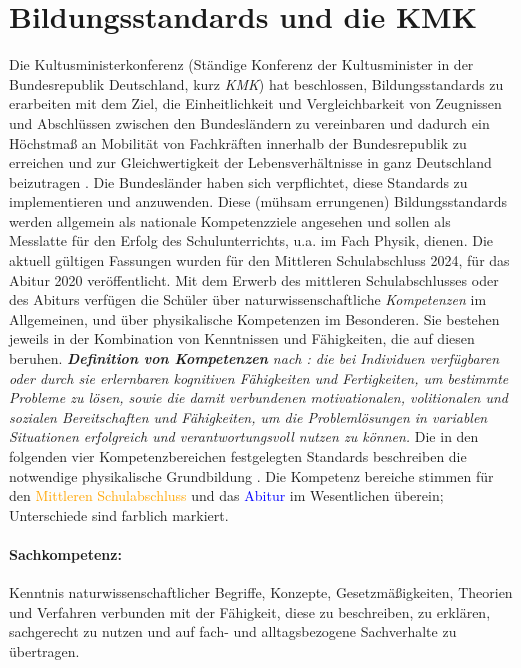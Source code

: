 \section{Bildungsstandards und die KMK}\label{KmK}
Die Kultusministerkonferenz (Ständige Konferenz der Kultusminister in der Bundesrepublik Deutschland, kurz \emph{KMK}) hat beschlossen, Bildungsstandards zu erarbeiten mit dem Ziel, die Einheitlichkeit und Vergleichbarkeit von Zeugnissen und Abschl{\"u}ssen zwischen den Bundesl{\"a}ndern zu vereinbaren und dadurch ein H{\"o}chstma{\ss} an Mobilit{\"a}t von Fachkr{\"a}ften innerhalb der Bundesrepublik zu erreichen und  zur Gleichwertigkeit der Lebensverh{\"a}ltnisse in ganz Deutschland beizutragen \autocite{KMK}. Die Bundesl{\"a}nder haben sich verpflichtet, diese Standards zu implementieren und anzuwenden. Diese (m{\"u}hsam errungenen) Bildungsstandards werden allgemein als nationale Kompetenzziele angesehen und sollen als Messlatte f{\"u}r den Erfolg des Schulunterrichts, u.a. im Fach Physik, dienen. Die aktuell gültigen Fassungen wurden für den Mittleren Schulabschluss 2024, für das Abitur 2020 veröffentlicht.
\mip
Mit dem Erwerb des mittleren Schulabschlusses oder des Abiturs verf{\"u}gen die Schüler {\"u}ber naturwissenschaftliche \emph{Kompetenzen} im Allgemeinen, und {\"u}ber physikalische Kompetenzen im Besonderen. Sie bestehen jeweils in der Kombination von Kenntnissen und Fähigkeiten, die auf diesen beruhen.  
\mip
\leftskip=0.5cm \rightskip=0.5cm {\emph{{\textbf{Definition von Kompetenzen}} nach \textcite{Weinert}: die bei Individuen verf{\"u}gbaren oder durch sie erlernbaren kognitiven F{\"a}higkeiten und Fertigkeiten, um bestimmte Probleme zu 
l{\"o}sen, sowie die damit verbundenen motivationalen, volitionalen und sozialen Bereitschaften und F{\"a}higkeiten, um die Probleml{\"o}sungen in variablen Situationen erfolgreich und verantwortungsvoll nutzen zu k{\"o}nnen.}} 
\mip
\leftskip=0cm \rightskip=0cm Die in den folgenden vier Kompetenzbereichen festgelegten Standards beschreiben die notwendige physikalische Grundbildung \autocite{KMKneu}. Die Kompetenz bereiche stimmen für den \textcolor{orange}{Mittleren Schulabschluss} und das \textcolor{blue}{Abitur} im Wesentlichen überein; Unterschiede sind farblich markiert.

\paragraph{Sachkompetenz:} Kenntnis naturwissenschaftlicher Begriffe,
Konzepte, Gesetzmäßigkeiten, Theorien und Verfahren verbunden mit der Fähigkeit, diese zu
beschreiben, zu erklären, sachgerecht zu nutzen und auf fach- und alltagsbezogene Sachverhalte zu übertragen.


